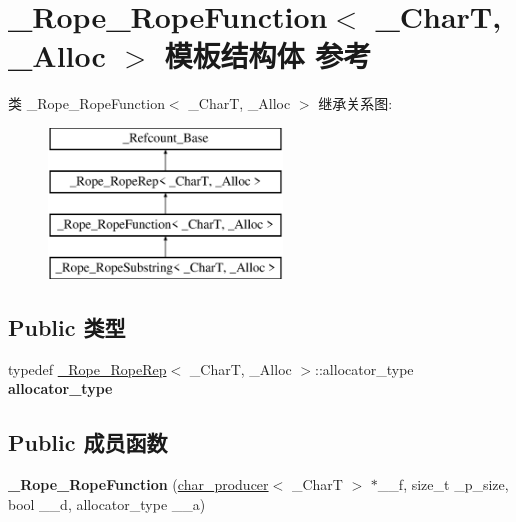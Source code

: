 \hypertarget{struct___rope___rope_function}{}\section{\+\_\+\+Rope\+\_\+\+Rope\+Function$<$ \+\_\+\+CharT, \+\_\+\+Alloc $>$ 模板结构体 参考}
\label{struct___rope___rope_function}
类 \+\_\+\+Rope\+\_\+\+Rope\+Function$<$ \+\_\+\+CharT, \+\_\+\+Alloc $>$ 继承关系图\+:\begin{figure}[H]
\begin{center}
\leavevmode
\includegraphics[height=4.000000cm]{struct___rope___rope_function}
\end{center}
\end{figure}
\subsection*{Public 类型}
\begin{DoxyCompactItemize}
\item 
\mbox{\label{struct___rope___rope_function_afa84e934bb0abf67d0784ba265aae8be}} 
typedef \hyperlink{struct___rope___rope_rep}{\+\_\+\+Rope\+\_\+\+Rope\+Rep}$<$ \+\_\+\+CharT, \+\_\+\+Alloc $>$\+::allocator\+\_\+type {\bfseries allocator\+\_\+type}
\end{DoxyCompactItemize}
\subsection*{Public 成员函数}
\begin{DoxyCompactItemize}
\item 
\mbox{\label{struct___rope___rope_function_ad061573ebb830482f42a428af46e8c19}} 
{\bfseries \+\_\+\+Rope\+\_\+\+Rope\+Function} (\hyperlink{classchar__producer}{char\+\_\+producer}$<$ \+\_\+\+CharT $>$ $\ast$\+\_\+\+\_\+f, size\+\_\+t \+\_\+p\+\_\+size, bool \+\_\+\+\_\+d, allocator\+\_\+type \+\_\+\+\_\+a)
\end{DoxyCompactItemize}
